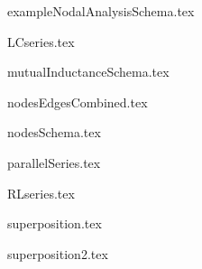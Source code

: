 \begin{frame}{exampleNodalAnalysisSchema.tex}
\begin{center}

\end{center}
\end{frame}

\begin{frame}{LCseries.tex}
\begin{center}

\end{center}
\end{frame}

\begin{frame}{mutualInductanceSchema.tex}
\begin{center}

\end{center}
\end{frame}

\begin{frame}{nodesEdgesCombined.tex}
\begin{center}

\end{center}
\end{frame}

\begin{frame}{nodesSchema.tex}
\begin{center}

\end{center}
\end{frame}

\begin{frame}{parallelSeries.tex}
\begin{center}

\end{center}
\end{frame}

\begin{frame}{RLseries.tex}
\begin{center}

\end{center}
\end{frame}

\begin{frame}{superposition.tex}
\begin{center}

\end{center}
\end{frame}

\begin{frame}{superposition2.tex}
\begin{center}

\end{center}
\end{frame}

